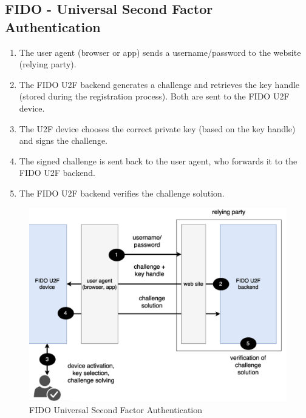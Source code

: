\subsection*{FIDO - Universal Second Factor Authentication}

\begin{multicols}{2}

\begin{enumerate}
    \item The user agent (browser or app) sends a username/password to the website (relying party).
    \item The FIDO U2F backend generates a challenge and retrieves the key handle (stored during the registration process). Both are sent to the FIDO U2F device.
    \item The U2F device chooses the correct private key (based on the key handle) and signs the challenge. 
    \item The signed challenge is sent back to the user agent, who forwards it to the FIDO U2F backend.
    \item The FIDO U2F backend verifies the challenge solution.
\end{enumerate}

\columnbreak

    \begin{figure}[H]
        \centering
        \includegraphics[width=\linewidth]{Images/Authentication/fidoauthn.png}
        \caption{FIDO Universal Second Factor Authentication}
    \end{figure}
\end{multicols}

